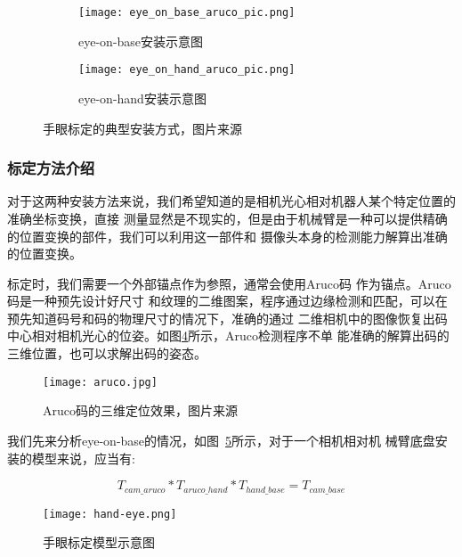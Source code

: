 \begin{figure}
\centering
\begin{subfigure}{.5\textwidth}
  \centering
  \texttt{[image: eye\_on\_base\_aruco\_pic.png]}
  \caption{eye-on-base安装示意图}
  \label{fig:eye_on_base}
\end{subfigure}%
\begin{subfigure}{.5\textwidth}
  \centering
  \texttt{[image: eye\_on\_hand\_aruco\_pic.png]}
  \caption{eye-on-hand安装示意图}
  \label{fig:eye_on_hand}
\end{subfigure}
\caption{手眼标定的典型安装方式，图片来源\cite{easy_handeye}}
\end{figure}


\subsubsection{标定方法介绍}

对于这两种安装方法来说，我们希望知道的是相机光心相对机器人某个特定位置的准确坐标变换，直接
测量显然是不现实的，但是由于机械臂是一种可以提供精确的位置变换的部件，我们可以利用这一部件和
摄像头本身的检测能力解算出准确的位置变换。

标定时，我们需要一个外部锚点作为参照，通常会使用Aruco码\cite{garrido2014automatic}
作为锚点。Aruco码是一种预先设计好尺寸
和纹理的二维图案，程序通过边缘检测和匹配，可以在预先知道码号和码的物理尺寸的情况下，准确的通过
二维相机中的图像恢复出码中心相对相机光心的位姿。如图\ref{fig:aruco}所示，Aruco检测程序不单
能准确的解算出码的三维位置，也可以求解出码的姿态。

\begin{figure}[ht] %
  \centering
  \texttt{[image: aruco.jpg]}
  \caption{Aruco码的三维定位效果，图片来源\cite{aruco}}
  \label{fig:aruco}
\end{figure}

我们先来分析eye-on-base的情况，如图~\ref{fig:hand_eye}所示，对于一个相机相对机
械臂底盘安装的模型来说，应当有:

\begin{equation}
  T_{cam\_aruco} * T_{aruco\_hand} * T_{hand\_base} = T_{cam\_base}
\end{equation}

\begin{figure}[ht] %
  \centering
  \texttt{[image: hand-eye.png]}
  \caption{手眼标定模型示意图}
  \label{fig:hand_eye}
\end{figure}

